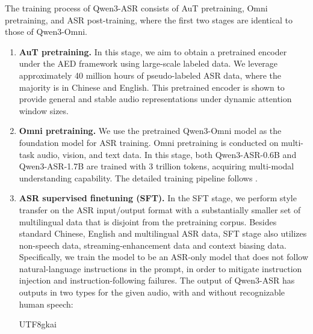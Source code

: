 The training process of Qwen3-ASR consists of AuT pretraining, Omni pretraining, and ASR post-training, where the first two stages are identical to those of Qwen3-Omni.
\begin{enumerate}[label=(\arabic*)]
    \item \textbf{AuT pretraining.} In this stage, we aim to obtain a pretrained encoder under the AED framework using large-scale labeled data. We leverage approximately 40 million hours of pseudo-labeled ASR data, where the majority is in Chinese and English. This pretrained encoder is shown to provide general and stable audio representations under dynamic attention window sizes.

    \item \textbf{Omni pretraining.} We use the pretrained Qwen3-Omni model as the foundation model for ASR training. Omni pretraining is conducted on multi-task audio, vision, and text data. In this stage, both Qwen3-ASR-0.6B and Qwen3-ASR-1.7B are trained with 3 trillion tokens, acquiring multi-modal understanding capability. The detailed training pipeline follows \citep{arxiv2025-jinxu-qwen3omni}.

    \item \textbf{ASR supervised finetuning (SFT).} In the SFT stage, we perform style transfer on the ASR input/output format with a substantially smaller set of multilingual data that is disjoint from the pretraining corpus. Besides standard Chinese, English and multilingual ASR data, SFT stage also utilizes non-speech data, streaming-enhancement data and context biasing data. Specifically, we train the model to be an ASR-only model that does not follow natural-language instructions in the prompt, in order to mitigate instruction injection and instruction-following failures. The output of Qwen3-ASR has outputs in two types for the given audio, with and without recognizable human speech:

    \begin{CJK*}{UTF8}{gkai}
\end{CJK*}
\end{enumerate}
